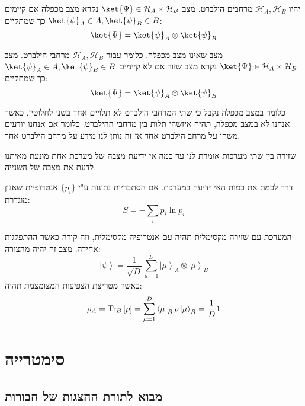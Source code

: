 \documentclass{tstextbook}
\begin{document}
\begin{definition}
יהיו \(\mathcal{H}_{A},\mathcal{H}_{B}\) מרחבים הילברט. מצב \(\ket{\Psi}\in \mathcal{H}_{A}\times \mathcal{H}_{B}\) נקרא מצב מכפלה אם קיימים \(\ket{\psi}_{A}\in A,\ket{\psi}_{B}\in B\) כך שמתקיים:
$$\ket{\Psi} =\ket{\psi} _{A}\otimes \ket{\psi} _{B}$$

\end{definition}
\begin{definition}
מצב שאינו מצב מכפלה. כלומר עבור \(\mathcal{H}_{A},\mathcal{H}_{B}\) מרחבי הילברט. מצב \(\ket{\Psi}\in \mathcal{H}_{A}\times \mathcal{H}_{B}\) נקרא מצב שזור אם לא קיימים \(\ket{\psi}_{A}\in A,\ket{\psi}_{B}\in B\) כך שמתקיים:
$$\ket{\Psi} =\ket{\psi} _{A}\otimes \ket{\psi} _{B}$$

\end{definition}
כלומר במצב מכפלה נקבל כי שתי המרחבי הילברט לא תלויים אחד בשני לחלוטין, כאשר אנחנו לא במצב מכפלה, תהיה איזשהי תלות בין מרחבי ההילברט. כלומר אם אנחנו יודעים משהו על מרחב הילברט אחד אז זה נותן לנו מידע על מרחב הילברט אחר.

\begin{definition}[שזירה]
שזירה בין שתי מערכות אומרת לנו עד כמה אי ידיעת מצבה של מערכת אחת מונעת מאיתנו לדעת את מצבה של השנייה.

\end{definition}
\begin{definition}
דרך לכמת את כמות האי ידיעה במערכת. אם הסתבריות נתונות ע"י \(\{ p_{i} \}\) אנטרופיית שאנון מוגדרת:
$$S=-\sum_{i}p_{i}\ln p_{i}$$

\end{definition}
\begin{proposition}
המערכת עם שזירה מקסימלית תהיה עם אנטרופיה מקסימלית, וזה קורה כאשר ההתפלגות אחידה. מצב זה יהיה מהצורה:
$$\left|\psi\right\rangle={\frac{1}{\sqrt{D}}}{\sum_{\mu=1}^{D}{\left|\mu\right\rangle}_{A}\otimes{\left|\mu\right\rangle}_{B}}$$
כאשר מטריצת הצפיפות המצומצמת תהיה:
$$\rho_{A}=\mathrm{Tr}_{B}\left[\rho\right]=\sum_{\mu=1}^{D}\left\langle\mu\right|_{B}\rho\left|\mu\right\rangle_{B}=\frac{1}{D}{\bf1}$$

\end{proposition}
\chapter{סימטרייה}

\section{מבוא לתורת ההצגות של חבורות}
\end{document}

